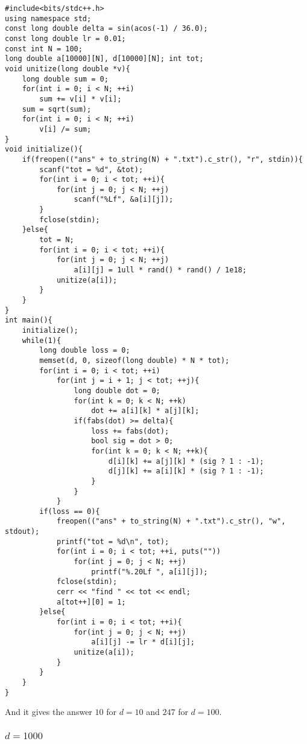\documentclass[12pt]{article}%
\begin{document}
\begin{verbatim}
#include<bits/stdc++.h>
using namespace std;
const long double delta = sin(acos(-1) / 36.0);
const long double lr = 0.01;
const int N = 100;
long double a[10000][N], d[10000][N]; int tot;
void unitize(long double *v){
    long double sum = 0;
    for(int i = 0; i < N; ++i)
        sum += v[i] * v[i];
    sum = sqrt(sum);
    for(int i = 0; i < N; ++i)
        v[i] /= sum;
}
void initialize(){
    if(freopen(("ans" + to_string(N) + ".txt").c_str(), "r", stdin)){
        scanf("tot = %d", &tot);
        for(int i = 0; i < tot; ++i){
            for(int j = 0; j < N; ++j)
                scanf("%Lf", &a[i][j]);
        }
        fclose(stdin);
    }else{
        tot = N;
        for(int i = 0; i < tot; ++i){
            for(int j = 0; j < N; ++j)
                a[i][j] = 1ull * rand() * rand() / 1e18;
            unitize(a[i]);
        }
    }
}
int main(){
    initialize();
    while(1){
        long double loss = 0;
        memset(d, 0, sizeof(long double) * N * tot);
        for(int i = 0; i < tot; ++i)
            for(int j = i + 1; j < tot; ++j){
                long double dot = 0;
                for(int k = 0; k < N; ++k)
                    dot += a[i][k] * a[j][k];
                if(fabs(dot) >= delta){
                    loss += fabs(dot);
                    bool sig = dot > 0;
                    for(int k = 0; k < N; ++k){
                        d[i][k] += a[j][k] * (sig ? 1 : -1);
                        d[j][k] += a[i][k] * (sig ? 1 : -1);
                    }
                }
            }
        if(loss == 0){
            freopen(("ans" + to_string(N) + ".txt").c_str(), "w", stdout);
            printf("tot = %d\n", tot);
            for(int i = 0; i < tot; ++i, puts(""))
                for(int j = 0; j < N; ++j)
                    printf("%.20Lf ", a[i][j]);
            fclose(stdin);
            cerr << "find " << tot << endl;
            a[tot++][0] = 1;
        }else{
            for(int i = 0; i < tot; ++i){
                for(int j = 0; j < N; ++j)
                    a[i][j] -= lr * d[i][j];
                unitize(a[i]);
            }
        }
    }
}
\end{verbatim}

And it gives the answer $10$ for $d = 10$ and $247$ for $d = 100$.

\subsubsection*{$d = 1000$}
\end{document}
